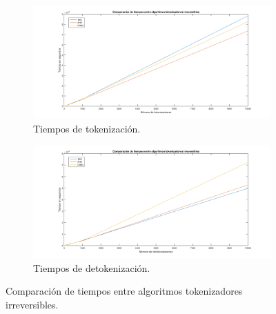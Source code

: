 \begin{figure}
  \centering
  \begin{subfigure}{1\textwidth}
    \begin{center}
      \includegraphics[width=1\linewidth]{diagramas/tok_irrev}
      \caption{Tiempos de tokenización.}
    \end{center}
  \end{subfigure}
  \begin{subfigure}{0.9\textwidth}
    \begin{center}
      \includegraphics[width=1\linewidth]{diagramas/detok_irrev}
      \caption{Tiempos de detokenización.}
    \end{center}
  \end{subfigure}
  \caption{Comparación de tiempos entre algoritmos tokenizadores irreversibles.}
  \label{figura:tok_irrev}
\end{figure}
